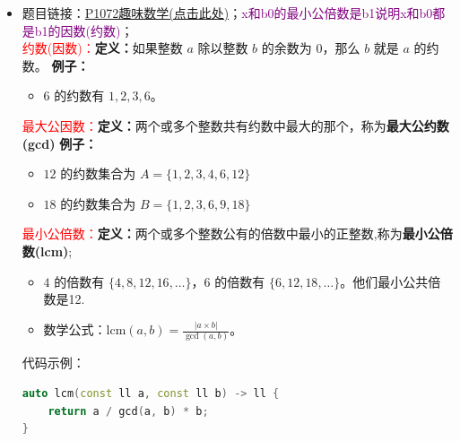 \begin{itemize}
\begin{lstlisting}[language=C++]
auto solve() -> void {
	ll m, n, k, l, d;
	cin >> m >> n >> k >> l >> d;
	for (ll i = 0; i < d; i++) {
		ll x1, y1, x2, y2;
		cin >> x1 >> y1 >> x2 >> y2;
		if (x1 == x2) {
		//col[]内部的下标是为了防止后续同样的纵列依旧新增数组大小
		//目的是吧同一个纵列或行列所能分开的对数最大化(贪心思想)
			col[min(y1, y2)].p = min(y1, y2);
			col[min(y1, y2)].num++;
		} else {
			row[min(x1, x2)].p = min(x1, x2);
			row[min(x1, x2)].num++;
		}
	}
	sort(row, row + m, cmp1);
	sort(col, col + n, cmp1);
	sort(row, row + k, cmp2);
	sort(col, col + l, cmp2);
	for (ll i = 0; i < k; i++) {
		cout << row[i].p << " ";
	}
	cout << endl;
	for (ll i = 0; i < l; i++) {
		cout << col[i].p << " ";
	}
}
\end{lstlisting}
\subsubsection{P1072最大公因数(约数)和最小公倍数}
\item 题目链接：\href{https://www.luogu.com.cn/problem/P1072}{P1072趣味数学(点击此处)}；\textcolor{purple}{x和b0的最小公倍数是b1说明x和b0都是b1的因数(约数)}；\\
\textcolor{red}{约数(因数)：}\textbf{定义：}如果整数 $a$ 除以整数 $b$ 的余数为 $0$，那么 $b$ 就是 $a$ 的约数。
\textbf{例子：}
\begin{itemize}
	\item $6$ 的约数有 $1, 2, 3, 6$。
\end{itemize}
\textcolor{red}{最大公因数：}\textbf{定义：}两个或多个整数共有约数中最大的那个，称为\textbf{最大公约数(gcd)}
\textbf{例子：}
\begin{itemize}
	\item $12$ 的约数集合为 $A = \{1, 2, 3, 4, 6, 12\}$
	\item $18$ 的约数集合为 $B = \{1, 2, 3, 6, 9, 18\}$
\end{itemize}
\textcolor{red}{最小公倍数：}\textbf{定义：}两个或多个整数公有的倍数中最小的正整数,称为\textbf{最小公倍数(lcm)};
\begin{itemize}
	\item $4$ 的倍数有 $\{4, 8, 12, 16, \dots\}$，$6$ 的倍数有 $\{6, 12, 18, \dots\}$。他们最小公共倍数是12.
	\item 数学公式：$\text{lcm}(a, b) = \frac{|a \times b|}{\gcd(a, b)}$。
\end{itemize}
代码示例：\\
\begin{lstlisting}[language=C++]
auto lcm(const ll a, const ll b) -> ll {
	return a / gcd(a, b) * b;
}


\end{lstlisting}
\end{itemize}
